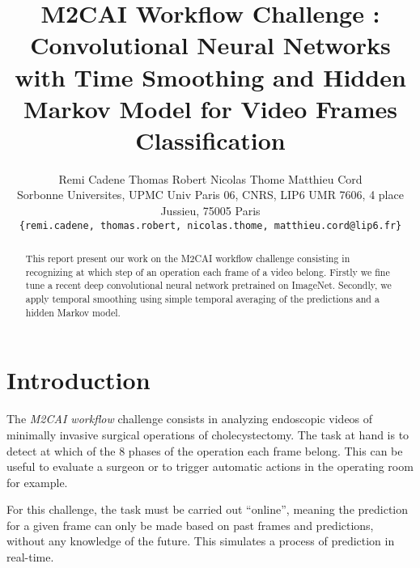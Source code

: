 \documentclass[10pt,twocolumn,letterpaper]{article}
\begin{document}
\title{M2CAI Workflow Challenge : Convolutional Neural Networks with Time Smoothing and Hidden Markov Model for Video Frames Classification}

\author{Remi Cadene \hspace{1cm} Thomas Robert \hspace{1cm} Nicolas Thome \hspace{1cm} Matthieu Cord\\
Sorbonne Universites, UPMC Univ Paris 06, CNRS, LIP6 UMR 7606, 4 place Jussieu, 75005 Paris\\
{\tt\small \{remi.cadene, thomas.robert, nicolas.thome, matthieu.cord@lip6.fr\}}
}

\maketitle

\begin{abstract}
  This report present our work on the M2CAI workflow challenge consisting in recognizing
at which step of an operation each frame of a video belong. Firstly we fine tune a recent
deep convolutional neural network pretrained on ImageNet. Secondly, we apply temporal smoothing
using simple temporal averaging of the predictions and a hidden Markov model. 
\end{abstract}

\section{Introduction}

The \emph{M2CAI workflow} challenge consists in analyzing endoscopic videos of
minimally invasive surgical operations of cholecystectomy. The task at hand is
to detect at which of the 8 phases of the operation each frame belong. This can
be useful to evaluate a surgeon or to trigger automatic actions in the operating
room for example.

For this challenge, the task must be carried out ``online'', meaning the prediction
for a given frame can only be made based on past frames and predictions, without
any knowledge of the future. This simulates a process of prediction in real-time.
\end{document}
